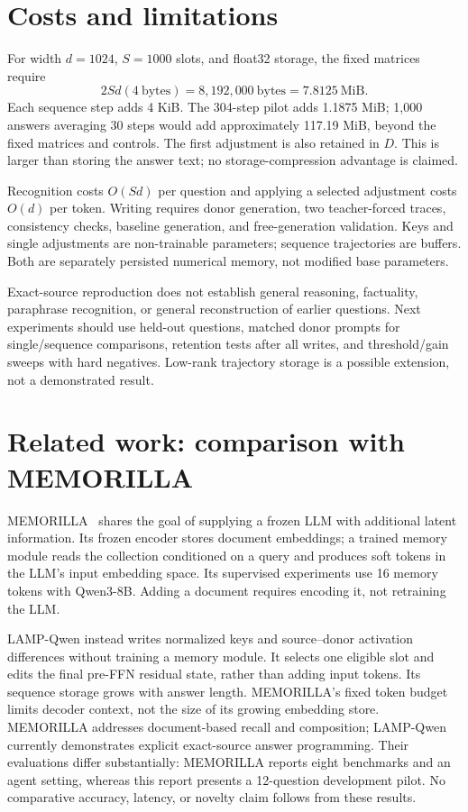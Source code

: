 \documentclass[manuscript,screen,nonacm]{acmart}
\begin{document}
\section{Costs and limitations}
For width $d=1024$, $S=1000$ slots, and float32 storage, the fixed matrices require
\begin{equation}
2Sd(4\ \text{bytes})=8{,}192{,}000\ \text{bytes}=7.8125\ \text{MiB}.
\end{equation}
Each sequence step adds 4 KiB. The 304-step pilot adds 1.1875 MiB; 1,000 answers averaging 30 steps would add approximately 117.19 MiB, beyond the fixed matrices and controls. The first adjustment is also retained in $D$. This is larger than storing the answer text; no storage-compression advantage is claimed.

Recognition costs $O(Sd)$ per question and applying a selected adjustment costs $O(d)$ per token. Writing requires donor generation, two teacher-forced traces, consistency checks, baseline generation, and free-generation validation. Keys and single adjustments are non-trainable parameters; sequence trajectories are buffers. Both are separately persisted numerical memory, not modified base parameters.

Exact-source reproduction does not establish general reasoning, factuality, paraphrase recognition, or general reconstruction of earlier questions. Next experiments should use held-out questions, matched donor prompts for single/sequence comparisons, retention tests after all writes, and threshold/gain sweeps with hard negatives. Low-rank trajectory storage is a possible extension, not a demonstrated result.

\section{Related work: comparison with MEMORILLA}
MEMORILLA~\cite{memorilla} shares the goal of supplying a frozen LLM with additional latent information. Its frozen encoder stores document embeddings; a trained memory module reads the collection conditioned on a query and produces soft tokens in the LLM's input embedding space. Its supervised experiments use 16 memory tokens with Qwen3-8B. Adding a document requires encoding it, not retraining the LLM.

LAMP-Qwen instead writes normalized keys and source--donor activation differences without training a memory module. It selects one eligible slot and edits the final pre-FFN residual state, rather than adding input tokens. Its sequence storage grows with answer length. MEMORILLA's fixed token budget limits decoder context, not the size of its growing embedding store. MEMORILLA addresses document-based recall and composition; LAMP-Qwen currently demonstrates explicit exact-source answer programming. Their evaluations differ substantially: MEMORILLA reports eight benchmarks and an agent setting, whereas this report presents a 12-question development pilot. No comparative accuracy, latency, or novelty claim follows from these results.
\end{document}
